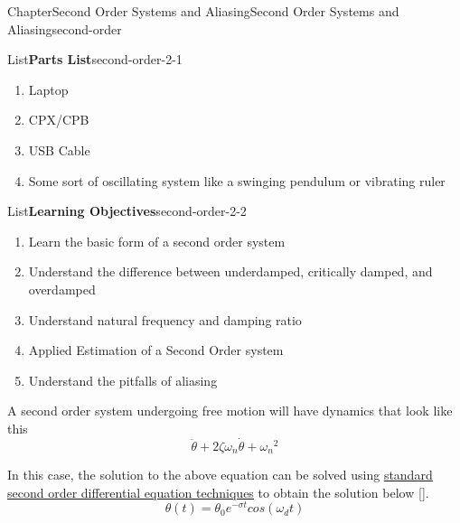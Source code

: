 \documentclass[oneside,10pt,]{book}
\newcommand{\xreffont}{\relax}
\newcommand{\linkhilite}[1]{\underline{#1}}
\numberwithin{equation}{section}
\begin{document}
%
%
\typeout{************************************************}
\typeout{************************************************}
%
\begin{chapterptx}{Chapter}{Second Order Systems and Aliasing}{}{Second Order Systems and Aliasing}{}{}{second-order}
\renewcommand*{\chaptername}{Chapter}
\begin{introduction}{}%
\begin{listptx}{List}{\textbf{Parts List}}{second-order-2-1}{}%
%
\begin{enumerate}
\item{}Laptop%
\item{}CPX\slash{}CPB%
\item{}USB Cable%
\item{}Some sort of oscillating system like a swinging pendulum or vibrating ruler%
\end{enumerate}
\end{listptx}%
\begin{listptx}{List}{\textbf{Learning Objectives}}{second-order-2-2}{}%
%
\begin{enumerate}
\item{}Learn the basic form of a second order system%
\item{}Understand the difference between underdamped, critically damped, and overdamped%
\item{}Understand natural frequency and damping ratio%
\item{}Applied Estimation of a Second Order system%
\item{}Understand the pitfalls of aliasing%
\end{enumerate}
\end{listptx}%
A second order system undergoing free motion will have dynamics that look like this%
\begin{equation}
\ddot{\theta} + 2\zeta \omega_n \dot{\theta} + {\omega_n}^2\label{second-order-2-3-1}
\end{equation}
%
\par
In this case, the solution to the above equation can be solved using \href{https://www.youtube.com/watch?v=VOv2HI3i7oo}{\linkhilite{standard second order differential equation techniques}} to obtain the solution below \hyperlink{youtube}{\linkhilite{[{\xreffont 50}]}}.%
\begin{equation}
\theta(t) = \theta_0e^{-\sigma t}cos(\omega_d t)\label{e_secondorder}
\end{equation}
%
\begin{equation}

\end{equation}
\end{introduction}
\end{chapterptx}
\end{document}
